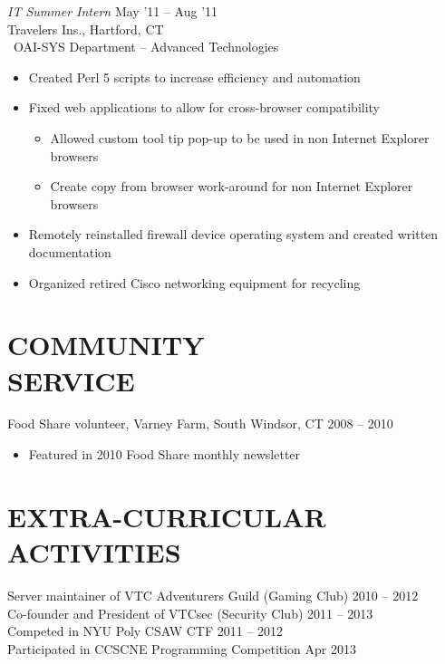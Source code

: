 \documentclass[margin]{res}
\begin{document}
\begin{resume}
                     {\sl IT Summer Intern} \hfill  May '11 -- Aug '11 \\
                     Travelers Ins., Hartford, CT\\\
                     OAI-SYS Department -- Advanced Technologies
                     \begin{itemize}  \itemsep -2pt %
                         \item Created Perl 5 scripts to increase efficiency and 
                               automation
                         \item Fixed web applications to allow for cross-browser 
                               compatibility
                         \begin{itemize}
                             \item Allowed custom tool tip pop-up to be used in non
                                   Internet Explorer \\browsers
                             \item Create copy from browser work-around for non
                                   Internet Explorer \\browsers
                         \end{itemize}
                         \item Remotely reinstalled firewall device operating
                               system and created written \\documentation
                         \item Organized retired Cisco networking equipment for
                               recycling
                     \end{itemize} 
 
\section{COMMUNITY \\ SERVICE} Food Share volunteer, Varney Farm, South 
                Windsor, CT \hfill 2008 -- 2010
                \begin{itemize}
                    \item Featured in 2010 Food Share monthly newsletter
                \end{itemize}
     

\section{EXTRA-CURRICULAR \\ ACTIVITIES} 
                Server maintainer of VTC Adventurers Guild (Gaming Club)
                    \hfill 2010 -- 2012\\
                Co-founder and President of VTCsec (Security Club) 
                    \hfill 2011 -- 2013\\
                Competed in NYU Poly CSAW CTF \hfill 2011 -- 2012\\
                Participated in CCSCNE Programming Competition
                	\hfill Apr 2013\\
 

\end{resume}
\end{document}
